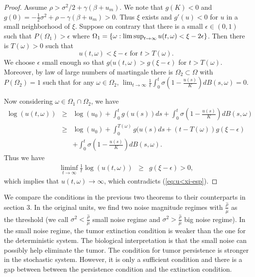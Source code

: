 \documentclass{aims}
\theoremstyle{definition}
\begin{document}
 \begin{proof}
 Assume $\rho>\sigma^{2}/2+\gamma(\beta+u_m)$. We note that $g(K)<0$
 and $g(0)=-\frac{1}{2}\sigma^{2}+\rho-\gamma(\beta+u_{m})>0$. Thus
 $\xi$ exists and $g'(u)<0$ for $u$ in a small neighborhood of $\xi$.
 Suppose on contrary that there is a small $\epsilon\in(0,1)$ such that $P(\Omega_{1})>\epsilon$ where $\Omega_{1}=\{\omega: \limsup_{t\to\infty} u(t,\omega)<\text{\ensuremath{\xi-2\epsilon}}\}$.
 Then there is $T(\omega)>0$ such that  
 \begin{equation}
 u(t,\omega)<\xi-\epsilon\text{ for }t>T(\omega).\label{eq:u<xi-esp}
 \end{equation}
  We choose $\epsilon$ small enough so that $g(u(t,\omega)>g(\xi-\epsilon)$
 for $t>T(\omega)$. Moreover, by law of large numbers of martingale
 there is $\Omega_{2}\subset\Omega$ with $P(\Omega_{2})=1$ such that
  for any $\omega\in\Omega_{2}$, $\lim_{t\to\infty}\frac{1}{t}\int_{0}^{t}\sigma(1-\frac{u(s)}{K})dB(s,\omega)=0$.
 
 Now considering $\omega\in\Omega_{1}\cap\Omega_{2}$, we have
 \begin{eqnarray*}
 \log(u(t,\omega)) & \ge & \log(u_{0})+\int_{0}^{t}g(u(s))ds+\int_{0}^{t}\sigma(1-\frac{u(s)}{K})dB(s,\omega)\\
  & \ge & \log(u_{0})+\int_{0}^{T(\omega)}g(u(s)ds+(t-T(\omega))g(\xi-\epsilon)\\
  &  & +\int_{0}^{t}\sigma(1-\frac{u(s)}{K})dB(s,\omega).
 \end{eqnarray*}
 Thus we have 
 \begin{eqnarray*}
 \liminf_{t\to\infty}\frac{1}{t}\log(u(t,\omega)) & \ge & g(\xi-\epsilon)>0,
 \end{eqnarray*}
 which implies that $u(t,\omega)\to\infty$, which contradicts (\ref{eq:u<xi-esp}). 
 \end{proof}
 We compare the conditions in the previous two theorems to their counterparts
 in section 3. In the original units, we find two noise magnitude regimes
 with $\frac{\hat{\rho}}{\hat{\mu}}$ as the threshold (we call $\sigma^{2}<\frac{\hat{\rho}}{\hat{\mu}}$
 small noise regime and $\sigma^{2}>\frac{\hat{\rho}}{\hat{\mu}}$ big noise regime).
 In the small noise regime, the tumor extinction condition is weaker
 than the one for the deterministic system. The biological interpretation
 is that the small noise can possibly help eliminate the tumor. The
 condition for tumor persistence is stronger in the stochastic system.
 However, it is only a sufficient condition and there is a gap between
 between the persistence condition and the extinction condition. 
 
\end{document}
